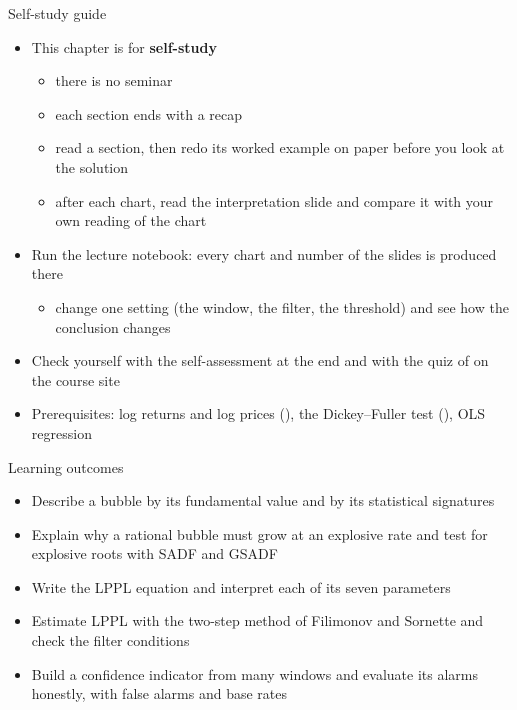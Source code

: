 \begin{frame}{Self-study guide}
\itemsize{\small}
\begin{itemize}
    \item This chapter is for \textbf{self-study}
    \begin{itemize}
        \item there is no seminar
        \item each section ends with a recap
        \item read a section, then redo its worked example on paper before you look at the solution
        \item after each chart, read the interpretation slide and compare it with your own reading of the chart
    \end{itemize}
    \item Run the lecture notebook: every chart and number of the slides is produced there
    \begin{itemize}
        \item change one setting (the window, the filter, the threshold) and see how the conclusion changes
    \end{itemize}
    \item Check yourself with the self-assessment at the end and with the quiz of  on the course site
    \item Prerequisites: log returns and log prices (), the Dickey--Fuller test (), OLS regression
\end{itemize}
\end{frame}

\begin{frame}{Learning outcomes}
\itemsize{\small}
\begin{itemize}
    \item Describe a bubble by its fundamental value and by its statistical signatures
    \item Explain why a rational bubble must grow at an explosive rate and test for explosive roots with SADF and GSADF
    \item Write the LPPL equation and interpret each of its seven parameters
    \item Estimate LPPL with the two-step method of Filimonov and Sornette and check the filter conditions
    \item Build a confidence indicator from many windows and evaluate its alarms honestly, with false alarms and base rates
\end{itemize}
\end{frame}

